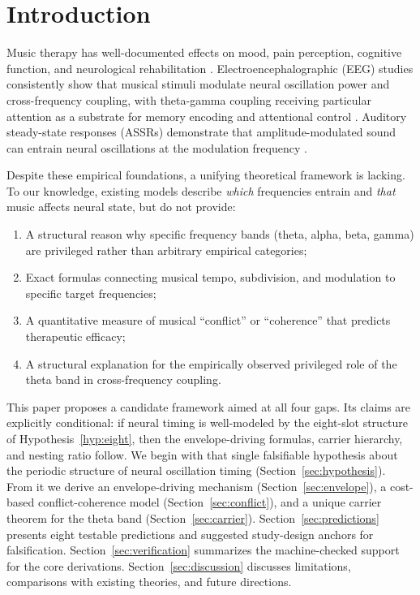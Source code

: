 \documentclass[11pt,a4paper]{article}
\begin{document}
\section{Introduction}
\label{sec:intro}

Music therapy has well-documented effects on mood, pain perception,
cognitive function, and neurological rehabilitation
\citep{thaut2014,bradt2021}. Electroencephalographic (EEG) studies
consistently show that musical stimuli modulate neural oscillation power
and cross-frequency coupling, with theta-gamma coupling receiving
particular attention as a substrate for memory encoding and attentional
control \citep{lisman2013,canolty2010}. Auditory steady-state responses
(ASSRs) demonstrate that amplitude-modulated sound can entrain neural
oscillations at the modulation frequency \citep{galambos1981,picton2003}.

Despite these empirical foundations, a unifying theoretical framework is
lacking. To our knowledge, existing models describe \emph{which}
frequencies entrain and
\emph{that} music affects neural state, but do not provide:
\begin{enumerate}[label=(\alph*)]
  \item A structural reason why specific frequency bands (theta, alpha,
    beta, gamma) are privileged rather than arbitrary empirical
    categories;
  \item Exact formulas connecting musical tempo, subdivision, and
    modulation to specific target frequencies;
  \item A quantitative measure of musical ``conflict'' or ``coherence''
    that predicts therapeutic efficacy;
  \item A structural explanation for the empirically observed privileged
    role of the theta band in cross-frequency coupling.
\end{enumerate}

This paper proposes a candidate framework aimed at all four gaps. Its
claims are explicitly conditional: if neural timing is well-modeled by
the eight-slot structure of Hypothesis~\ref{hyp:eight}, then the
envelope-driving formulas, carrier hierarchy, and nesting ratio follow.
We begin with that single falsifiable hypothesis about the periodic
structure of neural oscillation timing
(Section~\ref{sec:hypothesis}). From it we derive an envelope-driving
mechanism (Section~\ref{sec:envelope}), a cost-based
conflict-coherence model (Section~\ref{sec:conflict}), and a unique
carrier theorem for the theta band (Section~\ref{sec:carrier}).
Section~\ref{sec:predictions} presents eight testable predictions and
suggested study-design anchors for falsification.
Section~\ref{sec:verification} summarizes the machine-checked support
for the core derivations. Section~\ref{sec:discussion} discusses
limitations, comparisons with existing theories, and future directions.
\end{document}
